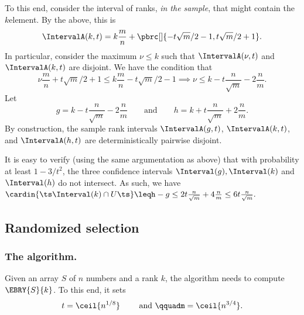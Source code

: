 To this end, consider the interval of ranks, \emph{in the sample},
that might contain the $k$\th element. By the above, this is
\begin{equation*}
  \IntervalA(k, t)%
  =%
  k \frac{m}{n} + \pbrc[]{ -t \sqrt{m}/2 -1, t
  \sqrt{m}/2 +1}.
\end{equation*}
In particular, consider the maximum $\nu\leq k$ such that
$\IntervalA(\nu, t)$ and $\IntervalA(k, t)$ are disjoint. We have the
condition that
\begin{equation*}
    \nu \frac{m}{n}  +t
    \sqrt{m}/2 +1 \leq k \frac{m}{n} -t\sqrt{m}/2 -1%
    \implies%
    \nu  \leq k  - t \frac{n}{\sqrt{m}} -2\frac{n}{m}.
\end{equation*}
Let
\begin{equation*}
    g= k - t \frac{n}{\sqrt{m}} -2\frac{n}{m}
    \qquad\text{and}\qquad
    h = k + t \frac{n}{\sqrt{m}} +2\frac{n}{m}.
\end{equation*}
By construction, the sample rank intervals $\IntervalA(g, t)$,
$\IntervalA(k, t)$, and $\IntervalA(h, t)$ are deterministically pairwise
disjoint.

It is easy to verify (using the same argumentation as above) that with
probability at least $1-3/t^2$, the three confidence intervals
$\Interval(g), \Interval(k)$ and $\Interval(h)$ do not intersect. As
such, we have
\begin{math}
    \cardin{\big.\ts \Interval(k) \cap U\ts}%
    \leq%
    h-g%
    \leq%
    2 t \frac{n}{\sqrt{m}} + 4 \frac{n}{m} \leq 6 t \frac{n}{\sqrt{m}}.
\end{math}










\subsection{Randomized selection}

\subsubsection{The algorithm.}
Given an array $S$ of $n$ numbers and a rank $k$, the algorithm needs to
compute $\EBRY{S}{k}$. To this end, it sets
\begin{equation*}
    t= \ceil{n^{1/8}}
    \qquad\text{ and }\qquad%
    m = \ceil{n^{3/4}}.
\end{equation*}

